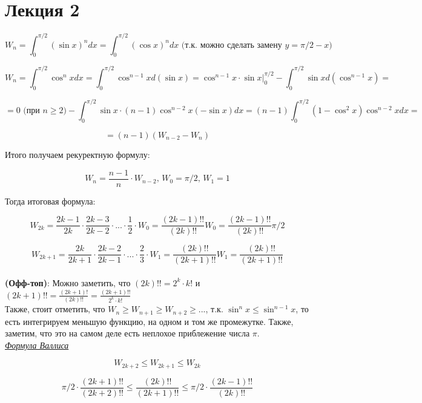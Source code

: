 \section*{Лекция 2}

\begin{example}

 \[
     W_n = \int_0^{\pi / 2}{(\sin{x})^n} dx = \int_0^{\pi / 2}{(\cos{x})^n}dx \text{ (т.к. можно сделать замену $y = \pi / 2 - x$)} 
\]

\[
    W_n = \int_0^{\pi / 2}\cos^n{x}dx = \int_0^{\pi / 2}\cos^{n - 1}{x} d(\sin{x}) = \cos^{n - 1}{x} \cdot \sin{x} \bigg|_{0}^{\pi/2} - \int_{0}^{\pi / 2}\sin{x} d(\cos^{n - 1}{x}) = 
\]

\[
    = 0 \text{ (при $n \geqslant 2$)} - \int_0^{\pi / 2} \sin{x} \cdot (n - 1) \cos^{n - 2}{x}(-\sin{x}) dx = (n - 1)\int_{0}^{\pi / 2}(1 - \cos^2{x}) \cos^{n - 2}{x} dx = 
\]

\[
    = (n - 1)(W_{n - 2} - W_{n})
\]

Итого получаем рекуректную формулу:

\[
    W_n = \frac{n - 1}{n} \cdot W_{n - 2}, \, W_0 = \pi / 2, \, W_1 = 1
\]

Тогда итоговая формула:

\[
    W_{2k} = \frac{2k - 1}{2k} \cdot \frac{2k - 3}{2k - 2} \cdot ... \cdot \frac{1}{2} \cdot W_0 = \frac{(2k - 1)!!}{(2k)!!} W_0 = \frac{(2k - 1)!!}{(2k)!!} \pi / 2
\]

\[
    W_{2k + 1} = \frac{2k}{2k + 1} \cdot \frac{2k - 2}{2k - 1} \cdot ... \cdot \frac{2}{3} \cdot W_1 = \frac{(2k)!!}{(2k + 1)!!} W_1 = \frac{(2k)!!}{(2k + 1)!!} 
\]
\\

\textbf{(Офф-топ)}: Можно заметить, что $(2k)!! = 2 ^ k \cdot k!$ и $(2k + 1)!! = \frac{(2k + 1)!}{(2k)!!} = \frac{(2k + 1)!!}{2^k \cdot k!}$
\\
\newpage
Также, стоит отметить, что $W_n \geqslant W_{n + 1} \geqslant W_{n + 2} \geqslant ...$, т.к. $\sin^n{x} \leqslant \sin^{n - 1}{x}$, то есть интегрируем меньшую функцию, на одном и том же промежутке.
Также, заметим, что это на самом деле есть неплохое приблежение числа $\pi$.\\

\underline{\textit{Формула Валлиса}}

\[
    W_{2k + 2} \leqslant W_{2k + 1} \leqslant W_{2k}
\]

\[
    \pi / 2 \cdot \frac{(2k + 1)!!}{(2k + 2)!!} \leqslant \frac{(2k)!!}{(2k + 1)!!} \leqslant \pi / 2 \cdot \frac{(2k - 1)!!}{(2k)!!}
\]


\end{example}
